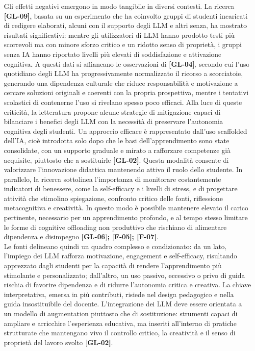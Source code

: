 \documentclass[a4paper,9pt]{article}
\begin{document}
Gli effetti negativi emergono in modo tangibile in diversi contesti. La ricerca \textbf{[GL-09]}, basata su un esperimento che ha coinvolto gruppi di studenti incaricati di redigere elaborati, alcuni con il supporto degli LLM e altri senza, ha mostrato risultati significativi: mentre gli utilizzatori di LLM hanno prodotto testi più scorrevoli ma con minore sforzo critico e un ridotto senso di proprietà, i gruppi senza IA hanno riportato livelli più elevati di soddisfazione e attivazione cognitiva. A questi dati si affiancano le osservazioni di \textbf{[GL-04]}, secondo cui l’uso quotidiano degli LLM ha progressivamente normalizzato il ricorso a scorciatoie, generando una dipendenza culturale che riduce responsabilità e motivazione a cercare soluzioni originali e coerenti con la propria prospettiva, mentre i tentativi scolastici di contenerne l’uso si rivelano spesso poco efficaci.
Alla luce di queste criticità, la letteratura propone alcune strategie di mitigazione capaci di bilanciare i benefici degli LLM con la necessità di preservare l’autonomia cognitiva degli studenti. Un approccio efficace è rappresentato dall’uso scaffolded dell’IA, cioè introdotta solo dopo che le basi dell’apprendimento sono state consolidate, con un supporto graduale e mirato a rafforzare competenze già acquisite, piuttosto che a sostituirle \textbf{[GL-02]}. Questa modalità consente di valorizzare l’innovazione didattica mantenendo attivo il ruolo dello studente. In parallelo, la ricerca sottolinea l’importanza di monitorare costantemente indicatori di benessere, come la self-efficacy e i livelli di stress, e di progettare attività che stimolino spiegazione, confronto critico delle fonti, riflessione metacognitiva e creatività. In questo modo è possibile mantenere elevato il carico pertinente, necessario per un apprendimento profondo, e al tempo stesso limitare le forme di cognitive offloading non produttivo che rischiano di alimentare dipendenza e disimpegno \textbf{[GL-06]; [F-05]; [F-07]}.\\
Le fonti delineano quindi un quadro complesso e condizionato: da un lato, l’impiego dei LLM rafforza motivazione, engagement e self-efficacy, risultando apprezzato dagli studenti per la capacità di rendere l’apprendimento più stimolante e personalizzato; dall’altro, un uso passivo, eccessivo o privo di guida rischia di favorire dipendenza e di ridurre l’autonomia critica e creativa. La chiave interpretativa, emersa in più contributi, risiede nel design pedagogico e nella guida insostituibile del docente. L’integrazione dei LLM deve essere orientata a un modello di augmentation piuttosto che di sostituzione: strumenti capaci di ampliare e arricchire l’esperienza educativa, ma inseriti all’interno di pratiche strutturate che mantengano vivo il controllo critico, la creatività e il senso di proprietà del lavoro svolto \textbf{[GL-02]}.
\end{document}
